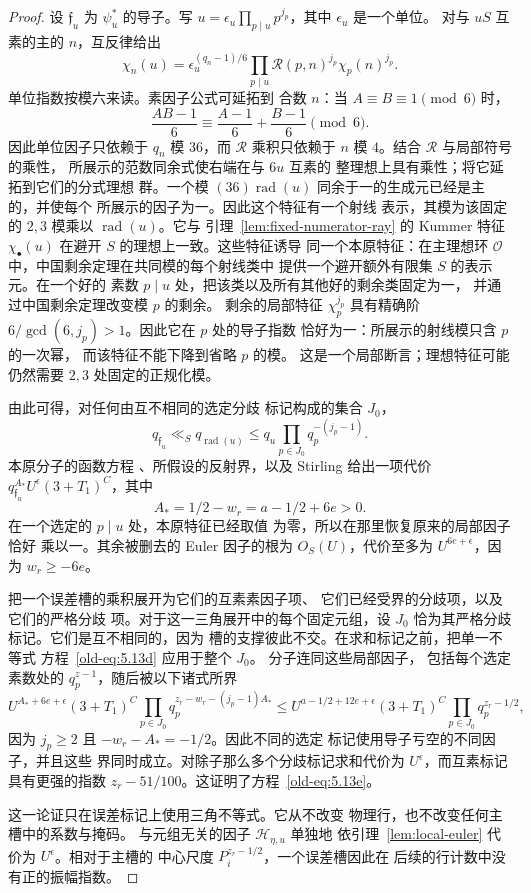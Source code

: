 \documentclass[11pt,a4paper]{article}
\numberwithin{equation}{section}
\numberwithin{figure}{section}
\theoremstyle{definition}
\theoremstyle{remark}
\begin{document}
\begin{proof}
设 $\mathfrak f_u$ 为 $\psi_u^*$ 的导子。写
$u=\epsilon_u\prod_{p\mid u}p^{j_p}$，其中 $\epsilon_u$ 是一个单位。
对与 $uS$ 互素的主的 $n$，互反律给出
\[
 \chi_n(u)=\epsilon_u^{(q_n-1)/6}
       \prod_{p\mid u}\mathcal R(p,n)^{j_p}\chi_p(n)^{j_p}.
\]
单位指数按模六来读。素因子公式可延拓到
合数 $n$：当 $A\equiv B\equiv1\pmod6$ 时，
\[
 \frac{AB-1}{6}\equiv\frac{A-1}{6}+\frac{B-1}{6}\pmod6.
\]
因此单位因子只依赖于 $q_n$ 模 $36$，而
$\mathcal R$ 乘积只依赖于 $n$ 模 $4$。结合
$\mathcal R$ 与局部符号的乘性，
所展示的范数同余式使右端在与 $6u$ 互素的
整理想上具有乘性；将它延拓到它们的分式理想
群。一个模
$(36)\operatorname{rad}(u)$ 同余于一的生成元已经是主的，并使每个
所展示的因子为一。因此这个特征有一个射线
表示，其模为该固定的 $2,3$ 模乘以
$\operatorname{rad}(u)$。它与
引理~\ref{lem:fixed-numerator-ray} 的 Kummer 特征
$\chi_\bullet(u)$ 在避开 $S$ 的理想上一致。这些特征诱导
同一个本原特征：在主理想环
$\mathcal O$ 中，中国剩余定理在共同模的每个射线类中
提供一个避开额外有限集 $S$ 的表示元。在一个好的
素数 $p\mid u$ 处，把该类以及所有其他好的剩余类固定为一，
并通过中国剩余定理改变模 $p$ 的剩余。
剩余的局部特征 $\chi_p^{j_p}$ 具有精确阶
$6/\gcd(6,j_p)>1$。因此它在 $p$ 处的导子指数
恰好为一：所展示的射线模只含 $p$ 的一次幂，
而该特征不能下降到省略 $p$ 的模。
这是一个局部断言；理想特征可能仍然需要
$2,3$ 处固定的正规化模。

由此可得，对任何由互不相同的选定分歧
标记构成的集合 $J_0$，
\begin{equation}\label{old-eq:5.13d}
 q_{\mathfrak f_u}\ll_S q_{\operatorname{rad}(u)}
       \le q_u\prod_{p\in J_0}q_p^{-(j_p-1)}.
\end{equation}
本原分子的函数方程
\cite[方程 (1.1)]{GZ}、所假设的反射界，以及 Stirling
给出一项代价
$q_{\mathfrak f_u}^{A_*}U^\epsilon(3+T_1)^C$，其中
\[
 A_*=1/2-w_r=a-1/2+6e>0.
\]
在一个选定的 $p\mid u$ 处，本原特征已经取值
为零，所以在那里恢复原来的局部因子恰好
乘以一。其余被删去的 Euler 因子的根为
$O_S(U)$，代价至多为 $U^{6e+\epsilon}$，因为 $w_r\ge-6e$。

把一个误差槽的乘积展开为它们的互素素因子项、
它们已经受界的分歧项，以及它们的严格分歧
项。对于这一三角展开中的每个固定元组，设 $J_0$
恰为其严格分歧标记。它们是互不相同的，因为
槽的支撑彼此不交。在求和标记之前，把单一不等式
方程~\eqref{old-eq:5.13d} 应用于整个 $J_0$。
分子连同这些局部因子，
包括每个选定素数处的 $q_p^{z-1}$，随后被以下诸式所界
\[
 U^{A_*+6e+\epsilon}(3+T_1)^C
 \prod_{p\in J_0}q_p^{z_r-w_r-(j_p-1)A_*}
 \le U^{a-1/2+12e+\epsilon}(3+T_1)^C
       \prod_{p\in J_0}q_p^{z_r-1/2},
\]
因为 $j_p\ge2$ 且 $-w_r-A_*=-1/2$。因此不同的选定
标记使用导子亏空的不同因子，并且这些
界同时成立。对除子那么多个分歧标记求和代价为
$U^\epsilon$，而互素标记具有更强的指数
$z_r-51/100$。这证明了方程~\eqref{old-eq:5.13e}。

这一论证只在误差标记上使用三角不等式。它从不改变
物理行，也不改变任何主槽中的系数与掩码。
与元组无关的因子 $\mathcal H_{\eta,u}$ 单独地
依引理~\ref{lem:local-euler} 代价为 $U^\epsilon$。相对于主槽的
中心尺度 $P_i^{z_r-1/2}$，一个误差槽因此在
后续的行计数中没有正的振幅指数。
\end{proof}
\end{document}
